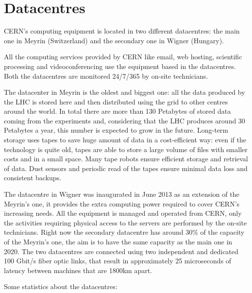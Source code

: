 \section{Datacentres}

CERN's computing equipment is located in two different datacentres: the
main one in Meyrin (Switzerland) and the secondary one in Wigner
(Hungary).

All the computing services provided by CERN like email, web hosting,
scientific processing and videoconferencing use the equipment based in the
datacentres. Both the datacentres are monitored 24/7/365 by on-site
technicians.

The datacenter in Meyrin is the oldest and biggest one: all the data
produced by the LHC is stored here and then distributed using the grid to
other centres around the world. In total there are more than 130 Petabytes
of stored data coming from the experiments and, considering that the LHC
produces around 30 Petabytes a year, this number is expected to grow in
the future. Long-term storage uses tapes to save huge amount of data in
a cost-efficient way: even if the technology is quite old, tapes are able
to store a large volume of files with smaller costs and in a small space.
Many tape robots ensure efficient storage and retrieval of data. Dust
sensors and periodic read of the tapes ensure minimal data loss and
consistent backups.

The datacentre in Wigner was inaugurated in June 2013 as an extension of
the Meyrin's one, it provides the extra computing power required to cover
CERN's increasing needs. All the equipment is managed and operated from
CERN, only the activities requiring physical access to the servers are
performed by the on-site technicians. Right now the secondary datacentre
has around 30\% of the capacity of the Meyrin's one, the aim is to have
the same capacity as the main one in 2020. The two datacentres are
connected using two independent and dedicated 100 Gbit/s fiber optic
links, that result in approximately 25 microseconds of latency between
machines that are 1800km apart.

Some statistics about the datacentres:

